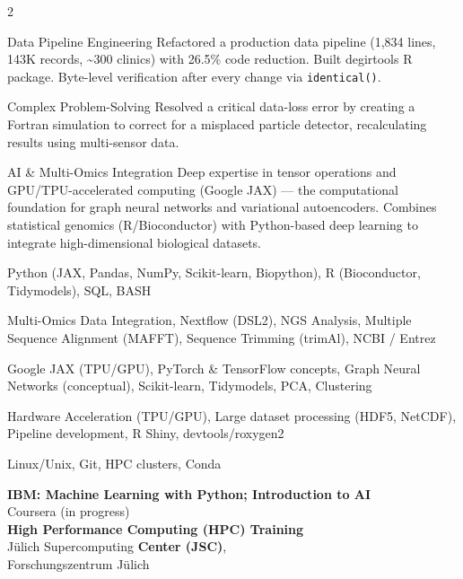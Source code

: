 \documentclass{thejus_cv}
\begin{document}
\begin{paracol}{2}


\cvstrength{\faStar}
           {Data Pipeline Engineering}
           {Refactored a production data pipeline (1,834 lines, 143K records, \textasciitilde300 clinics) with 26.5\% code reduction. Built degirtools R package. Byte-level verification after every change via \texttt{identical()}.}

\cvstrength{\faLightbulb}
           {Complex Problem-Solving}
           {Resolved a critical data-loss error by creating a Fortran simulation to correct for a misplaced particle detector, recalculating results using multi-sensor data.}

\cvstrength{\faAward}
           {AI \& Multi-Omics Integration}
           {Deep expertise in tensor operations and GPU/TPU-accelerated computing (Google JAX) — the computational foundation for graph neural networks and variational autoencoders. Combines statistical genomics (R/Bioconductor) with Python-based deep learning to integrate high-dimensional biological datasets.}


         {Python (JAX, Pandas, NumPy, Scikit-learn, Biopython), R (Bioconductor, Tidymodels), SQL, BASH}

         {Multi-Omics Data Integration, Nextflow (DSL2), NGS Analysis, Multiple Sequence Alignment (MAFFT), Sequence Trimming (trimAl), NCBI / Entrez}

         {Google JAX (TPU/GPU), PyTorch \& TensorFlow concepts, Graph Neural Networks (conceptual), Scikit-learn, Tidymodels, PCA, Clustering}

         {Hardware Acceleration (TPU/GPU), Large dataset processing (HDF5, NetCDF), Pipeline development, R Shiny, devtools/roxygen2}

         {Linux/Unix, Git, HPC clusters, Conda}



\textbf{IBM: Machine Learning with Python; Introduction to AI}\\
{\small Coursera (in progress)}\\[0.3cm]

\textbf{High Performance Computing (HPC) Training}\\
J\"ulich Supercomputing \textbf{Center (JSC)},\\
Forschungszentrum J\"ulich\\[0.3cm]


\end{paracol}
\end{document}
